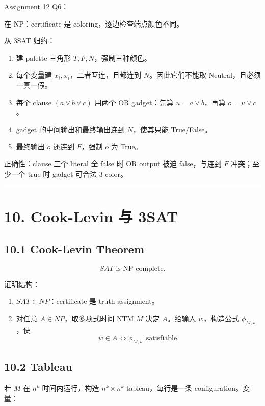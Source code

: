 ﻿\documentclass[UTF8,11pt]{ctexart}
\begin{document}
Assignment 12 Q6：


在 NP：certificate 是 coloring，逐边检查端点颜色不同。


从 3SAT 归约：


\begin{enumerate}
\item 建 palette 三角形 \(T,F,N\)，强制三种颜色。
\item 每个变量建 \(x_i,\overline{x_i}\)，二者互连，且都连到 \(N\)。因此它们不能取 Neutral，且必须一真一假。
\item 每个 clause \((a\vee b\vee c)\) 用两个 OR gadget：先算 \(u=a\vee b\)，再算 \(o=u\vee c\)。
\item gadget 的中间输出和最终输出连到 \(N\)，使其只能 True/False。
\item 最终输出 \(o\) 还连到 \(F\)，强制 \(o\) 为 True。
\end{enumerate}


正确性：clause 三个 literal 全 false 时 OR output 被迫 false，与连到 \(F\) 冲突；至少一个 true 时 gadget 可合法 3-color。


\bigskip\hrule\bigskip


\section{10. Cook-Levin 与 3SAT}


\subsection{10.1 Cook-Levin Theorem}


\[
SAT\text{ is NP-complete}.
\]


证明结构：


\begin{enumerate}
\item \(SAT\in NP\)：certificate 是 truth assignment。
\item 对任意 \(A\in NP\)，取多项式时间 NTM \(M\) 决定 \(A\)。给输入 \(w\)，构造公式 \(\phi_{M,w}\)，使
\[
   w\in A\iff \phi_{M,w}\text{ satisfiable}.
   \]

\end{enumerate}


\subsection{10.2 Tableau}


若 \(M\) 在 \(n^k\) 时间内运行，构造 \(n^k\times n^k\) tableau，每行是一条 configuration。变量：
\end{document}
